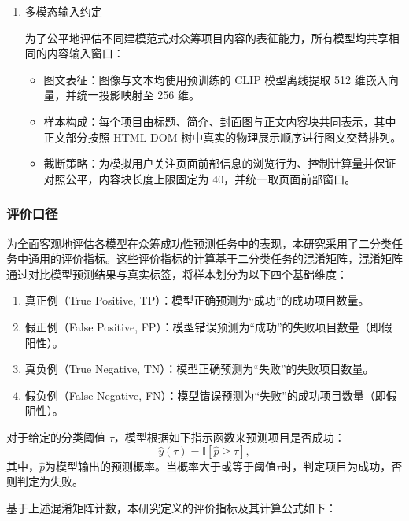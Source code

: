 \begin{enumerate}[label=(\arabic*)]
  \item 多模态输入约定

为了公平地评估不同建模范式对众筹项目内容的表征能力，所有模型均共享相同的内容输入窗口：

\begin{itemize}
  \item 图文表征：图像与文本均使用预训练的 CLIP 模型离线提取 512 维嵌入向量，并统一投影映射至 256 维。
  \item 样本构成：每个项目由标题、简介、封面图与正文内容块共同表示，其中正文部分按照 HTML DOM 树中真实的物理展示顺序进行图文交替排列。
  \item 截断策略：为模拟用户关注页面前部信息的浏览行为、控制计算量并保证对照公平，内容块长度上限固定为 40，并统一取页面前部窗口。
\end{itemize}
\end{enumerate}

\subsubsection{评价口径}
为全面客观地评估各模型在众筹成功性预测任务中的表现，本研究采用了二分类任务中通用的评价指标。这些评价指标的计算基于二分类任务的混淆矩阵，混淆矩阵通过对比模型预测结果与真实标签，将样本划分为以下四个基础维度：

\begin{enumerate}[label=(\arabic*)]
  \item 真正例（True Positive, TP）：模型正确预测为“成功”的成功项目数量。
  \item 假正例（False Positive, FP）：模型错误预测为“成功”的失败项目数量（即假阳性）。
  \item 真负例（True Negative, TN）：模型正确预测为“失败”的失败项目数量。
  \item 假负例（False Negative, FN）：模型错误预测为“失败”的成功项目数量（即假阴性）。
\end{enumerate}

对于给定的分类阈值 $ \tau $，模型根据如下指示函数来预测项目是否成功：
\begin{equation}
\hat{y}(\tau)=\mathbb{I}[\hat{p}\ge\tau],
\end{equation}
其中，$ \hat{p} $为模型输出的预测概率。当概率大于或等于阈值$ \tau $时，判定项目为成功，否则判定为失败。

基于上述混淆矩阵计数，本研究定义的评价指标及其计算公式如下：

